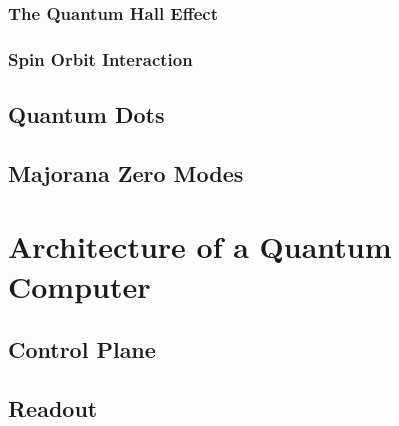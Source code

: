   \subsubsection{The Quantum Hall Effect}
  \subsubsection{Spin Orbit Interaction}
  \subsection{Quantum Dots}
  \subsection{Majorana Zero Modes}

\section{Architecture of a Quantum Computer}
\label{sec:arch}
  \subsection{Control Plane}
  \subsection{Readout}